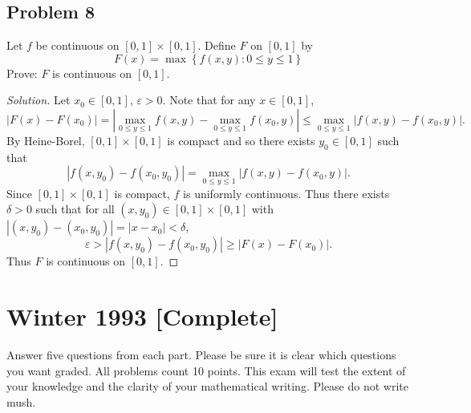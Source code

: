 \documentclass[12pt]{article}
\newcommand\setb[1]{\left \{ #1 \right \}}
\newcommand{\eps}{\varepsilon}
\theoremstyle{definition}
\begin{document}
\subsection{Problem 8}
Let $f$ be continuous on $[0,1] \times [0,1]$. Define $F$ on $[0,1]$ by 
\[
    F(x) = \max \setb{ f(x,y) : 0 \leq y \leq 1 }
\]
Prove: $F$ is continuous on $[0,1]$.
\begin{proof}[Solution]
    Let $x_0 \in [0,1]$, $\eps > 0$. Note that for any $x \in [0,1]$, 
    \[
        | F(x) - F(x_0) | = \left| \max\limits_{0 \leq y \leq 1} f(x,y) - \max\limits_{0 \leq y \leq 1} f(x_0,y) \right| \leq \max\limits_{0 \leq y \leq 1} | f(x,y) - f(x_0,y) |.
    \]
    By Heine-Borel, $[0,1] \times [0,1]$ is compact and so there exists $y_0 \in [0,1]$ such that 
    \[
        | f(x,y_0) - f(x_0,y_0) | = \max\limits_{0 \leq y \leq 1} | f(x,y) - f(x_0,y) |.
    \]
    Since $[0,1] \times [0,1]$ is compact, $f$ is uniformly continuous. Thus there exists $\delta > 0$ such that for all $(x,y_0) \in [0,1] \times [0,1]$ with $| (x,y_0) - (x_0,y_0) | = |x - x_0| < \delta$, 
    \[
        \eps > |f(x,y_0) - f(x_0,y_0)| \geq | F(x) - F(x_0) |.
    \]
    Thus $F$ is continuous on $[0,1]$.
\end{proof}
\newpage
\section{Winter 1993 [Complete]}
Answer five questions from each part. Please be sure it is clear which questions you want graded. All problems count 10 points. This exam will test the extent of your knowledge and the clarity of your mathematical writing. Please do not write mush.
\end{document}

